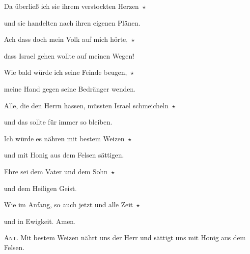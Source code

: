 \noindent Da überließ ich sie ihrem verstockten Herzen~$\star$~\nopagebreak

und sie handelten nach ihren eigenen Plänen. 

\noindent Ach dass doch mein Volk auf mich hörte,~$\star$~\nopagebreak

dass Israel gehen wollte auf meinen Wegen!

\noindent Wie bald würde ich seine Feinde beugen,~$\star$~\nopagebreak

meine Hand gegen seine Bedränger wenden. 

\noindent Alle, die den Herrn hassen, müssten Israel schmeicheln~$\star$~\nopagebreak

und das sollte für immer so bleiben. 

\noindent Ich würde es nähren mit bestem Weizen~$\star$~\nopagebreak

und mit Honig aus dem Felsen sättigen.

\noindent Ehre sei dem Vater und dem Sohn~$\star$~\nopagebreak

und dem Heiligen Geist.

\noindent Wie im Anfang, so auch jetzt und alle Zeit~$\star$~\nopagebreak

und in Ewigkeit. Amen.

\vspace{10pt}

\noindent \textsc{Ant.} Mit bestem Weizen nährt uns der Herr und sättigt uns mit Honig aus dem Felsen.